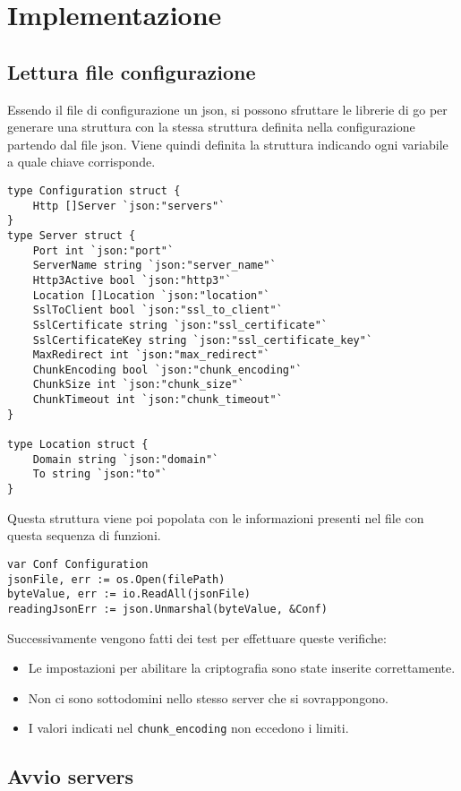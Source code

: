 \section{Implementazione}
\subsection{Lettura file configurazione}
Essendo il file di configurazione un json, si possono sfruttare le librerie di go per generare una struttura con la stessa struttura definita nella configurazione partendo dal file json. Viene quindi definita la struttura indicando ogni variabile a quale chiave corrisponde.
\begin{lstlisting}[language=Golang]
type Configuration struct {
	Http []Server `json:"servers"`
}
type Server struct {
	Port int `json:"port"`
	ServerName string `json:"server_name"`
	Http3Active bool `json:"http3"`
	Location []Location `json:"location"`
	SslToClient bool `json:"ssl_to_client"`
	SslCertificate string `json:"ssl_certificate"`
	SslCertificateKey string `json:"ssl_certificate_key"`
	MaxRedirect int `json:"max_redirect"`
	ChunkEncoding bool `json:"chunk_encoding"`
	ChunkSize int `json:"chunk_size"`
	ChunkTimeout int `json:"chunk_timeout"`
}

type Location struct {
	Domain string `json:"domain"`
	To string `json:"to"`
}
\end{lstlisting}
Questa struttura viene poi popolata con le informazioni presenti nel file con questa sequenza di funzioni.
\begin{lstlisting}[language=Golang]
var Conf Configuration
jsonFile, err := os.Open(filePath)
byteValue, err := io.ReadAll(jsonFile)
readingJsonErr := json.Unmarshal(byteValue, &Conf)
\end{lstlisting}
Successivamente vengono fatti dei test per effettuare queste verifiche:
\begin{itemize}
  \item Le impostazioni per abilitare la criptografia sono state inserite correttamente.
  \item Non ci sono sottodomini nello stesso server che si sovrappongono.
  \item I valori indicati nel \texttt{chunk\_encoding} non eccedono i limiti.
\end{itemize}

\subsection{Avvio servers}
